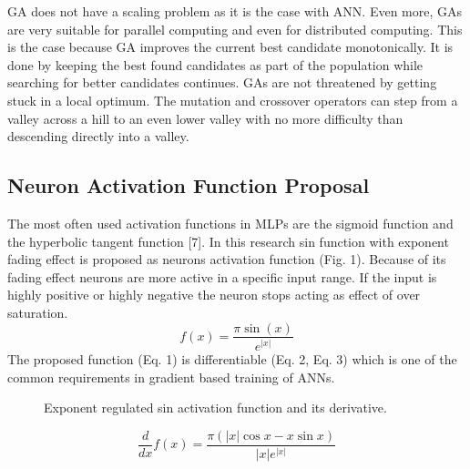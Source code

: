 \documentclass{llncs}
\begin{document}
GA does not have a scaling problem as it is the case with ANN. Even more, GAs are very suitable for parallel computing and even for distributed computing. This is the case because GA improves the current best candidate monotonically. It is done by keeping the best found candidates as part of the population while searching for better candidates continues. GAs are not threatened by getting stuck in a local optimum. The mutation and crossover operators can step from a valley across a hill to an even lower valley with no more difficulty than descending directly into a valley.
%
\subsection{Neuron Activation Function Proposal}
%
The most often used activation functions in MLPs are the sigmoid function and the hyperbolic tangent function [7]. In this research sin function with exponent fading effect is proposed as neurons activation function (Fig. 1). Because of its fading effect neurons are more active in a specific input range. If the input is highly positive or highly negative the neuron stops acting as effect of over saturation.
%
\begin{equation}
f(x) = \frac {\pi \sin(x)} { e^{ |x| }}
\end{equation}
%
The proposed function (Eq. 1) is differentiable (Eq. 2, Eq. 3) which is one of the common requirements in gradient based training of ANNs.
%
\begin{figure}
    \centering
    \caption{Exponent regulated sin activation function and its derivative.}
    \label{fig:fig01}
\end{figure}
%
\begin{equation}
\frac{d}{dx}f(x) = \frac {\pi (|x|\cos x - x\sin x)} { |x| e^{ |x| } }
\end{equation}
\end{document}
